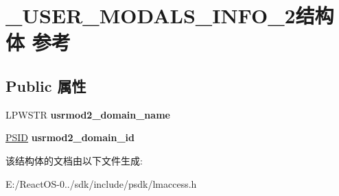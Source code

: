 \hypertarget{struct___u_s_e_r___m_o_d_a_l_s___i_n_f_o__2}{}\section{\+\_\+\+U\+S\+E\+R\+\_\+\+M\+O\+D\+A\+L\+S\+\_\+\+I\+N\+F\+O\+\_\+2结构体 参考}
\label{struct___u_s_e_r___m_o_d_a_l_s___i_n_f_o__2}
\subsection*{Public 属性}
\begin{DoxyCompactItemize}
\item 
\mbox{\label{struct___u_s_e_r___m_o_d_a_l_s___i_n_f_o__2_a2ae758a23e7be87a9a19fe2393d1689d}} 
L\+P\+W\+S\+TR {\bfseries usrmod2\+\_\+domain\+\_\+name}
\item 
\mbox{\label{struct___u_s_e_r___m_o_d_a_l_s___i_n_f_o__2_a2e7d55be1a9075b127e31240e3ae9302}} 
\hyperlink{struct___s_i_d}{P\+S\+ID} {\bfseries usrmod2\+\_\+domain\+\_\+id}
\end{DoxyCompactItemize}


该结构体的文档由以下文件生成\+:\begin{DoxyCompactItemize}
\item 
E\+:/\+React\+O\+S-\/0../sdk/include/psdk/lmaccess.\+h\end{DoxyCompactItemize}
